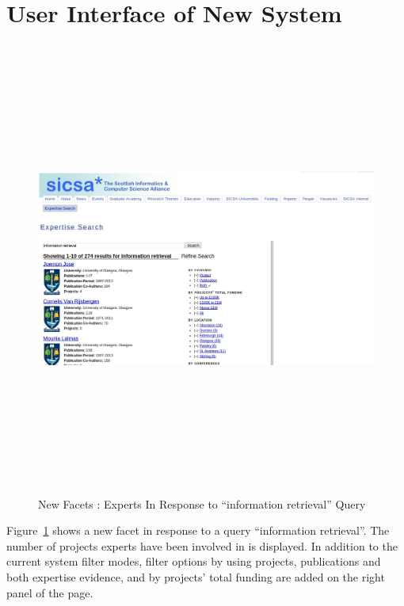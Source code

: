\section{User Interface of New System}

\begin{figure}
 \centering
 \includegraphics[width=13cm,height=15cm,keepaspectratio]{./figures/newsearch.png}
 \caption{New Facets : Experts In Response to ``information retrieval'' Query} \label{fig:newsearch} 
 \end{figure}
 Figure~\ref{fig:newsearch} shows a new facet in response to a query ``information retrieval''. The number of 
projects experts have been involved in is displayed. In addition to the current system filter modes, filter options by using projects, publications and both
expertise evidence, and by projects' total funding are added on the right panel of the page.

